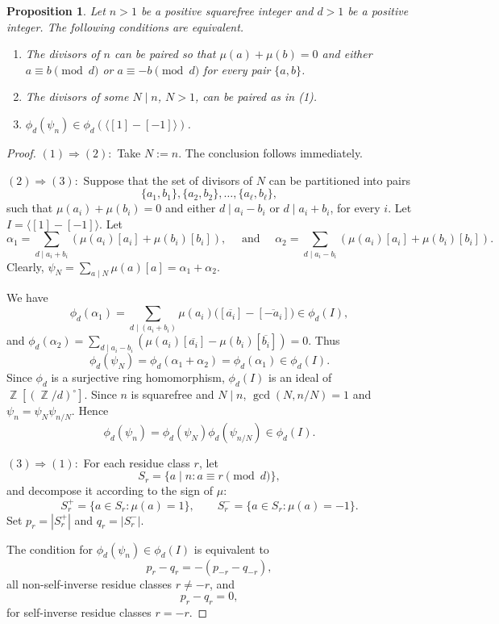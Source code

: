 \documentclass[12t,a4paper]{amsart}
\newtheorem{prop}[thm]{Proposition}
\theoremstyle{definition}
\DeclareMathOperator{\Z}{\mathbb{Z}}
\numberwithin{equation}{section}
\begin{document}
{\begin{prop} \label{pro:equivalence_02}
   Let $n>1$ be a positive squarefree integer and  $d>1$ be a positive integer. %
   The following conditions are equivalent.
   \begin{enumerate}
       \item The divisors of \(n\) can be paired so that
      \(\mu(a)+\mu(b)=0\) and either \(a\equiv b \pmod d\) or $a\equiv -b\pmod d$
      for every pair \(\{a,b\}\). 
          \item  The divisors of some $N\mid n$, $N>1$, can be paired as in (1).
           \item $\phi_d(\psi_n)\in \phi_d(\langle [1] - [-1] \rangle)$.%
   \end{enumerate}
   \end{prop}
\begin{proof}
    $(1)\Rightarrow (2):$ Take $N := n.$ The conclusion follows immediately.
    
    $(2)\Rightarrow (3):$ Suppose that the set of divisors of $N$ can be partitioned  into pairs 
        \[
\{a_1,b_1\},\{a_2,b_2\},\ldots,\{a_\ell,b_\ell\}, \] 
such that $\mu(a_i)+\mu(b_i)=0$ and either $d\mid a_i-b_i$ or $d\mid a_i+b_i$, for every $i$.  Let $I=\langle[1]-[-1]\rangle$.
    Let
\[
\alpha_1=\sum_{d\mid a_i+b_i}(\mu(a_i)[a_i]+\mu(b_i)[b_i]),\quad\text{ and  } \quad \alpha_2=\sum\limits_{d\mid a_i-b_i}(\mu(a_i)[a_i]+\mu(b_i)[b_i]).
\]
   Clearly, $\psi_N=\sum_{a\mid N}\mu(a)[a]=\alpha_1+\alpha_2$.  
    
We have 
\[
\phi_d(\alpha_1)
 =\sum_{d\mid (a_i+b_i)}\mu(a_i)\bigl([\overline{a_i}]-[\overline{-a_i}]\bigr)
 \in\phi_d(I),
 \]
and 
$
\phi_d(\alpha_2)=\sum\limits_{d\mid a_i-b_i}(\mu(a_i)[\overline{a_i}]-\mu(b_i)[\overline{b_i}]) =0.
$
Thus
\[
\phi_d(\psi_N)=\phi_d(\alpha_1+\alpha_2)=\phi_d(\alpha_1)\in\phi_d(I).
\]
Since $\phi_d$ is a surjective ring homomorphism, $\phi_d(I)$ is an ideal of $\Z[(\Z/d)^\circ]$. 
Since $n$ is squarefree  and $N\mid n$, $\gcd(N,n/N)=1$ and  $\psi_n = \psi_N \psi_{n/N}.$ Hence
\[
\phi_d(\psi_n)=\phi_d(\psi_N)\phi_d(\psi_{n/N})\in \phi_d(I).
\]

$(3)\Rightarrow (1):$
For each residue class $r$, let
\[
S_r=\{a\mid n : a\equiv r\pmod d\},
\]
and decompose it according to the sign of $\mu$:
\[
S_r^{+}=\{a\in S_r : \mu(a)=1\}, 
\qquad
S_r^{-}=\{a\in S_r : \mu(a)=-1\}.
\]
Set $p_r = |S_r^{+}|$ and $q_r = |S_r^{-}|$.  

The condition for $\phi_d(\psi_n)\in \phi_d(I)$ is equivalent to 
\[
p_r - q_r =-(p_{-r} - q_{-r}),
\]
all non-self-inverse residue classes $r\not=-r$, and
\[
p_r - q_r= 0,
\]
for self-inverse residue classes $r=-r$.



\end{proof}}
\end{document}
